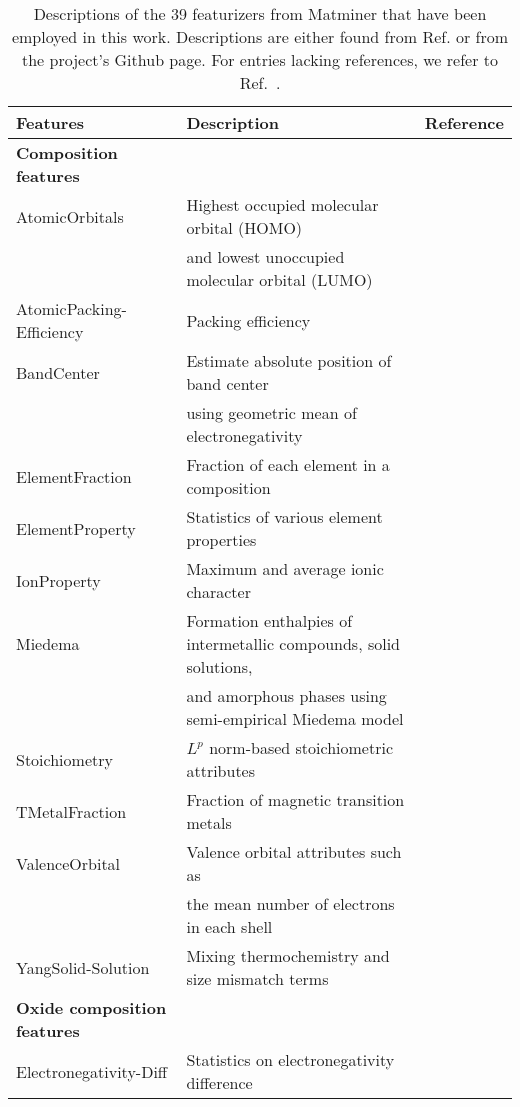 \begin{center}
\begin{longtable}{M{4.0cm} M{7.5cm} M{2.0cm}}
\caption{Descriptions of the 39 featurizers from Matminer that have been employed in this work. Descriptions are either found from Ref. \cite{Ward2018} or from the project's Github page. For entries lacking references, we refer to Ref.~\cite{Ward2018}.}
\label{table:featurizers} 
\\ \hline
Features & Description & Reference \\
\hline 
  \textbf{Composition features} & & \\ 
  AtomicOrbitals & Highest occupied molecular orbital (HOMO) & \cite{Kotochigova1997}  \\  
   & and lowest unoccupied molecular orbital (LUMO) &  \\  
  AtomicPacking-Efficiency & Packing efficiency & \cite{Laws2015}  \\   
  BandCenter & Estimate absolute position of band center  & \cite{Butler1978} \\   
   & using geometric mean of electronegativity &  \\  
  ElementFraction & Fraction of each element in a composition &    \\   
  ElementProperty & Statistics of various element properties & \cite{Ong2013,Ward2016, Deml2016}  \\   
  IonProperty & Maximum and average ionic character & \cite{Ward2016} \\   
  Miedema & Formation enthalpies of intermetallic compounds, solid solutions, & \cite{Weeber1987} \\   
   & and amorphous phases using semi-empirical Miedema model &  \\   
  Stoichiometry & $L^p$ norm-based stoichiometric attributes & \cite{Ward2016} \\   
  TMetalFraction & Fraction of magnetic transition metals & \cite{Deml2016}  \\   
  ValenceOrbital & Valence orbital attributes such as & \cite{Ward2016}  \\   
   &  the mean number of electrons in each shell &   \\   
  YangSolid-Solution & Mixing thermochemistry and size mismatch terms & \cite{Yang2012} \\
    \hline 
  \textbf{Oxide composition features} &  &  \\
  Electronegativity-Diff & Statistics on electronegativity difference & \cite{Deml2016} \\   

\end{longtable}
\end{center}
